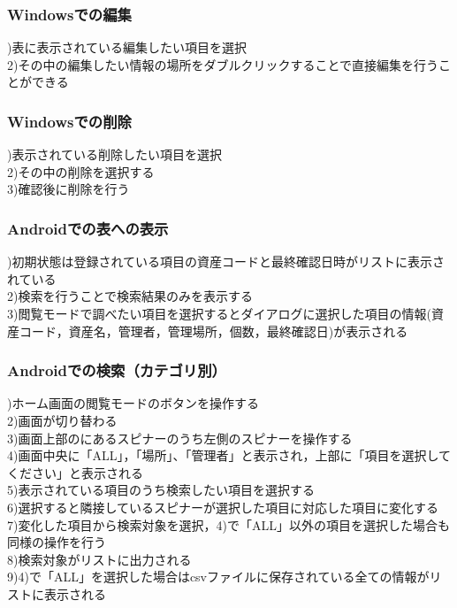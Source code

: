 \documentclass[11pt,a4j]{jarticle}
\begin{document}
\subsubsection{Windowsでの編集}
)表に表示されている編集したい項目を選択
\\2)その中の編集したい情報の場所をダブルクリックすることで直接編集を行うことができる

\subsubsection{Windowsでの削除}
)表示されている削除したい項目を選択
\\2)その中の削除を選択する
\\3)確認後に削除を行う

\subsubsection{Androidでの表への表示}
)初期状態は登録されている項目の資産コードと最終確認日時がリストに表示されている
\\2)検索を行うことで検索結果のみを表示する
\\3)閲覧モードで調べたい項目を選択するとダイアログに選択した項目の情報(資産コード，資産名，管理者，管理場所，個数，最終確認日)が表示される

\subsubsection{Androidでの検索（カテゴリ別）}
)ホーム画面の閲覧モードのボタンを操作する
\\2)画面が切り替わる
\\3)画面上部のにあるスピナーのうち左側のスピナーを操作する
\\4)画面中央に「ALL」，「場所」、「管理者」と表示され，上部に「項目を選択してください」と表示される
\\5)表示されている項目のうち検索したい項目を選択する
\\6)選択すると隣接しているスピナーが選択した項目に対応した項目に変化する
\\7)変化した項目から検索対象を選択，4)で「ALL」以外の項目を選択した場合も同様の操作を行う
\\8)検索対象がリストに出力される
\\9)4)で「ALL」を選択した場合はcsvファイルに保存されている全ての情報がリストに表示される
\end{document}
